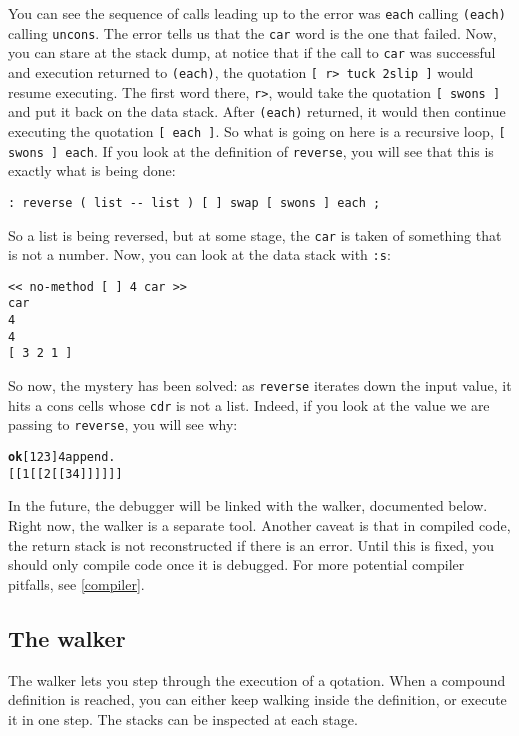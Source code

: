 \documentclass{book}
\begin{document}
You can see the sequence of calls leading up to the error was \texttt{each} calling \texttt{(each)} calling \texttt{uncons}. The error tells us that the \texttt{car} word is the one that failed. Now, you can stare at the stack dump, at notice that if the call to \texttt{car} was successful and execution returned to \texttt{(each)}, the quotation \texttt{[ r> tuck 2slip ]} would resume executing. The first word there, \texttt{r>}, would take the quotation \texttt{[ swons ]} and put it back on the data stack. After \texttt{(each)} returned, it would then continue executing the quotation \texttt{[ each ]}. So what is going on here is a recursive loop, \texttt{[ swons ] each}. If you look at the definition of \texttt{reverse}, you will see that this is exactly what is being done:

\begin{verbatim}
: reverse ( list -- list ) [ ] swap [ swons ] each ;
\end{verbatim}

So a list is being reversed, but at some stage, the \texttt{car} is taken of something that is not a number. Now, you can look at the data stack with \texttt{:s}:

\begin{verbatim}
<< no-method [ ] 4 car >>
car
4
4
[ 3 2 1 ]
\end{verbatim}

So now, the mystery has been solved: as \texttt{reverse} iterates down the input value, it hits a cons cells whose \texttt{cdr} is not a list. Indeed, if you look at the value we are passing to \texttt{reverse}, you will see why:

\begin{alltt}
\textbf{ok} [ 1 2 3 ] 4 append .
[[ 1 [[ 2 [[ 3 4 ]] ]] ]]
\end{alltt}

In the future, the debugger will be linked with the walker, documented below. Right now, the walker is a separate tool. Another caveat is that in compiled code, the return stack is not reconstructed if there is an error. Until this is fixed, you should only compile code once it is debugged. For more potential compiler pitfalls, see \ref{compiler}.

\subsection{The walker}

The walker lets you step through the execution of a qotation. When a compound definition is reached, you can either keep walking inside the definition, or execute it in one step. The stacks can be inspected at each stage.
\end{document}
